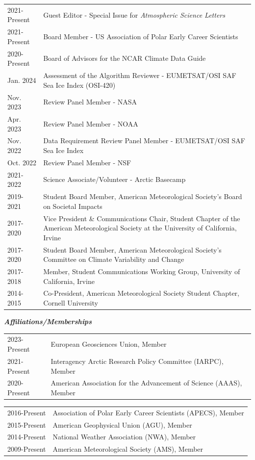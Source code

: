 \documentclass[margin,line,palatino,courier,10pt]{res}
\begin{document}
\begin{resume}
\begin{tabular}{@{}p{0.9in}p{4in}}
2021-Present & Guest Editor - Special Issue for \textit{Atmospheric Science Letters}\\
2021-Present & Board Member - US Association of Polar Early Career Scientists\\
2020-Present & Board of Advisors for the NCAR Climate Data Guide\\
Jan. 2024 & Assessment of the Algorithm Reviewer -  EUMETSAT/OSI SAF Sea Ice Index (OSI-420)\\ 
Nov. 2023 & Review Panel Member - NASA\\
Apr. 2023 & Review Panel Member - NOAA\\
Nov. 2022 & Data Requirement Review Panel Member -  EUMETSAT/OSI SAF Sea Ice Index\\ 
Oct. 2022 & Review Panel Member - NSF\\
2021-2022 & Science Associate/Volunteer - Arctic Basecamp\\
2019-2021& Student Board Member, American Meteorological Society's Board on Societal Impacts\\
2017-2020 & Vice President \& Communications Chair, Student Chapter of the American Meteorological Society at the University of California, Irvine\\
2017-2020 & Student Board Member, American Meteorological Society's Committee on Climate Variability and Change\\
2017-2018 & Member, Student Communications Working Group, University of California, Irvine\\
2014-2015 & Co-President, American Meteorological Society Student Chapter, Cornell University\\
\end{tabular}

\textit{\textbf{Affiliations/Memberships}}
\vspace*{0.05in}\\
\begin{tabular}{@{}p{0.9in}p{4in}}
2023-Present & European Geosciences Union, Member\\
2021-Present & Interagency Arctic Research Policy Committee (IARPC), Member\\
2020-Present & American Association for the Advancement of Science (AAAS), Member\\
\end{tabular}
\begin{tabular}{@{}p{0.9in}p{4in}}
2016-Present & Association of Polar Early Career Scientists (APECS), Member\\ 
2015-Present & American Geophysical Union (AGU), Member\\
2014-Present & National Weather Association (NWA), Member\\
2009-Present & American Meteorological Society (AMS), Member\\
\end{tabular}


\end{resume}
\end{document}
